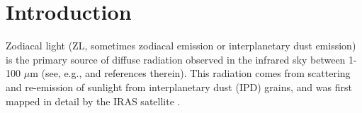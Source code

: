 \documentclass[twocolumn]{aa}
\begin{document}
{%
}


   \maketitle

\setcounter{tocdepth}{2}
\tableofcontents
   

\section{Introduction}
Zodiacal light (ZL, sometimes zodiacal emission or interplanetary dust
emission) is the primary source of diffuse radiation observed in the
infrared sky between 1-100 $\mu$m (see, e.g., \citealp{Leinert1998}
and references therein). This radiation comes from scattering and
re-emission of sunlight from interplanetary dust (IPD) grains, and was
first mapped in detail by the IRAS satellite
\citep{neugebauer:1984}.
\end{document}
